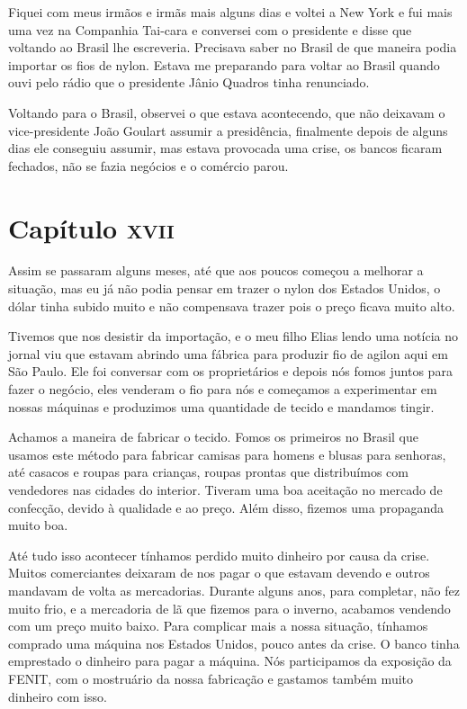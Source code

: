 Fiquei com meus irmãos e irmãs mais alguns dias e voltei a New York e
fui mais uma vez na Companhia Tai-cara e conversei com o presidente e
disse que voltando ao Brasil lhe escreveria. Precisava saber no Brasil
de que maneira podia importar os fios de nylon. Estava me preparando
para voltar ao Brasil quando ouvi pelo rádio que o presidente Jânio
Quadros tinha renunciado.

Voltando para o Brasil, observei o que estava acontecendo, que não
deixavam o vice-presidente João Goulart assumir a presidência,
finalmente depois de alguns dias ele conseguiu assumir, mas estava
provocada uma crise, os bancos ficaram fechados, não se fazia negócios e
o comércio parou.

\chapter{Capítulo \textsc{xvii}}

Assim se passaram alguns meses, até que aos poucos começou a melhorar a
situação, mas eu já não podia pensar em trazer o nylon dos Estados
Unidos, o dólar tinha subido muito e não compensava trazer pois o preço
ficava muito alto.

Tivemos que nos desistir da importação, e o meu filho Elias lendo uma
notícia no jornal viu que estavam abrindo uma fábrica para produzir fio
de agilon aqui em São Paulo. Ele foi conversar com os proprietários e
depois nós fomos juntos para fazer o negócio, eles venderam o fio para
nós e começamos a experimentar em nossas máquinas e produzimos uma
quantidade de tecido e mandamos tingir.

Achamos a maneira de fabricar o tecido. Fomos os primeiros no Brasil que
usamos este método para fabricar camisas para homens e blusas para
senhoras, até casacos e roupas para crianças, roupas prontas que
distribuímos com vendedores nas cidades do interior. Tiveram uma boa
aceitação no mercado de confecção, devido à qualidade e ao preço. Além
disso, fizemos uma propaganda muito boa.

Até tudo isso acontecer tínhamos perdido muito dinheiro por causa da
crise. Muitos comerciantes deixaram de nos pagar o que estavam devendo e
outros mandavam de volta as mercadorias. Durante alguns anos, para
completar, não fez muito frio, e a mercadoria de lã que fizemos para o
inverno, acabamos vendendo com um preço muito baixo. Para complicar mais
a nossa situação, tínhamos comprado uma máquina nos Estados Unidos,
pouco antes da crise. O banco tinha emprestado o dinheiro para pagar a
máquina. Nós participamos da exposição da FENIT, com o mostruário da
nossa fabricação e gastamos também muito dinheiro com isso.


